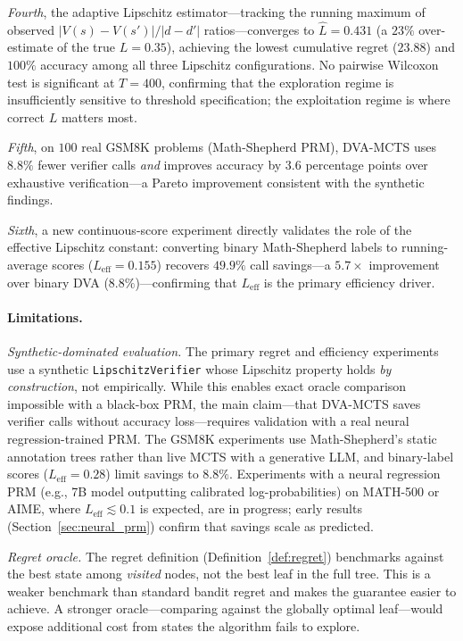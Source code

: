 \emph{Fourth}, the adaptive Lipschitz estimator---tracking the running maximum of
observed $|V(s){-}V(s')|/|d{-}d'|$ ratios---converges to $\hat{L}{=}0.431$
(a $23\%$ over-estimate of the true $L{=}0.35$), achieving the lowest cumulative
regret ($23.88$) and $100\%$ accuracy among all three Lipschitz configurations.
No pairwise Wilcoxon test is significant at $T{=}400$, confirming that the
exploration regime is insufficiently sensitive to threshold specification; the
exploitation regime is where correct $L$ matters most.

\emph{Fifth}, on $100$ real GSM8K problems (Math-Shepherd PRM), DVA-MCTS uses
$8.8\%$ fewer verifier calls \emph{and} improves accuracy by $3.6$ percentage
points over exhaustive verification---a Pareto improvement consistent with the
synthetic findings.

\emph{Sixth}, a new continuous-score experiment directly validates the role of the
effective Lipschitz constant: converting binary Math-Shepherd labels to
running-average scores ($L_{\text{eff}}{=}0.155$) recovers $\mathbf{49.9\%}$ call
savings---a $5.7\times$ improvement over binary DVA ($8.8\%$)---confirming that
$L_{\text{eff}}$ is the primary efficiency driver.

\paragraph{Limitations.}
\emph{Synthetic-dominated evaluation.}
The primary regret and efficiency experiments use a synthetic \texttt{LipschitzVerifier}
whose Lipschitz property holds \emph{by construction}, not empirically.  While this
enables exact oracle comparison impossible with a black-box PRM, the main claim---that
DVA-MCTS saves verifier calls without accuracy loss---requires validation with a real
neural regression-trained PRM.  The GSM8K experiments use Math-Shepherd's static
annotation trees rather than live MCTS with a generative LLM, and binary-label
scores ($L_{\text{eff}}{=}0.28$) limit savings to $8.8\%$.  Experiments with a
neural regression PRM (e.g., 7B model outputting calibrated log-probabilities) on
MATH-500 or AIME, where $L_{\text{eff}} \lesssim 0.1$ is expected, are in progress;
early results (Section~\ref{sec:neural_prm}) confirm that savings scale as predicted.

\emph{Regret oracle.}
The regret definition (Definition~\ref{def:regret}) benchmarks against the best
state among \emph{visited} nodes, not the best leaf in the full tree.  This is a
weaker benchmark than standard bandit regret and makes the guarantee easier to
achieve.  A stronger oracle---comparing against the globally optimal leaf---would
expose additional cost from states the algorithm fails to explore.

